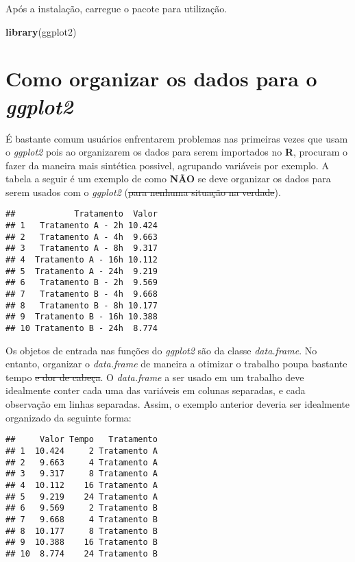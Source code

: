\documentclass[]{article}
\newenvironment{Shaded}{\begin{snugshade}}{\end{snugshade}}
\newcommand{\KeywordTok}[1]{\textcolor[rgb]{0.13,0.29,0.53}{\textbf{{#1}}}}
\newcommand{\NormalTok}[1]{{#1}}
\begin{document}
Após a instalação, carregue o pacote para utilização.

\begin{Shaded}
\begin{Highlighting}[]
\KeywordTok{library}\NormalTok{(ggplot2)}
\end{Highlighting}
\end{Shaded}

\section{\texorpdfstring{Como organizar os dados para o
\emph{ggplot2}}{Como organizar os dados para o ggplot2}}\label{como-organizar-os-dados-para-o-ggplot2}

É bastante comum usuários enfrentarem problemas nas primeiras vezes que
usam o \emph{ggplot2} pois ao organizarem os dados para serem importados
no \textbf{R}, procuram o fazer da maneira mais sintética possivel,
agrupando variáveis por exemplo. A tabela a seguir é um exemplo de como
\textbf{NÃO} se deve organizar os dados para serem usados com o
\emph{ggplot2} (\sout{para nenhuma situação na verdade}).

\begin{verbatim}
##            Tratamento  Valor
## 1   Tratamento A - 2h 10.424
## 2   Tratamento A - 4h  9.663
## 3   Tratamento A - 8h  9.317
## 4  Tratamento A - 16h 10.112
## 5  Tratamento A - 24h  9.219
## 6   Tratamento B - 2h  9.569
## 7   Tratamento B - 4h  9.668
## 8   Tratamento B - 8h 10.177
## 9  Tratamento B - 16h 10.388
## 10 Tratamento B - 24h  8.774
\end{verbatim}

Os objetos de entrada nas funções do \emph{ggplot2} são da classe
\emph{data.frame}. No entanto, organizar o \emph{data.frame} de maneira
a otimizar o trabalho poupa bastante tempo \sout{e dor de cabeça}. O
\emph{data.frame} a ser usado em um trabalho deve idealmente conter cada
uma das variáveis em colunas separadas, e cada observação em linhas
separadas. Assim, o exemplo anterior deveria ser idealmente organizado
da seguinte forma:

\begin{verbatim}
##     Valor Tempo   Tratamento
## 1  10.424     2 Tratamento A
## 2   9.663     4 Tratamento A
## 3   9.317     8 Tratamento A
## 4  10.112    16 Tratamento A
## 5   9.219    24 Tratamento A
## 6   9.569     2 Tratamento B
## 7   9.668     4 Tratamento B
## 8  10.177     8 Tratamento B
## 9  10.388    16 Tratamento B
## 10  8.774    24 Tratamento B
\end{verbatim}
\end{document}
